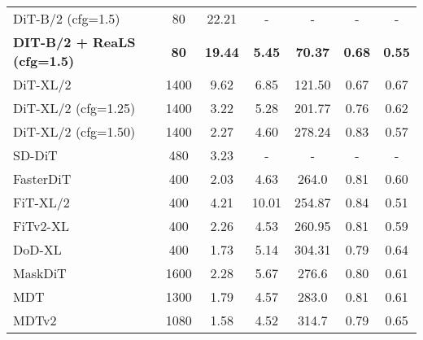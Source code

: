 \begin{table}[t]
{\begin{tabular}{lcccccc}
 \midrule

DiT-B/2 (cfg=1.5)~\cite{dit}          & 80     & 22.21           & -                & -            & -                   & -                \\
\rowcolor{blue!15} \textbf{DIT-B/2 + ReaLS (cfg=1.5)}   & \textbf{80}     & \textbf{19.44}           & \textbf{5.45}             & \textbf{70.37}        & \textbf{0.68}                & \textbf{0.55}             \\ 
DiT-XL/2                   & 1400   & 9.62            & 6.85             & 121.50       & 0.67                & 0.67             \\
DiT-XL/2 (cfg=1.25)      & 1400       & 3.22            & 5.28             & 201.77       & 0.76                & 0.62             \\
DiT-XL/2 (cfg=1.50)      & 1400       & 2.27            & 4.60             & 278.24       & 0.83                & 0.57             \\ 
SD-DiT~\cite{zhu2024sd}                     & 480    & 3.23            & -                & -            & -                   & -                \\ 
FasterDiT~\cite{yao2024fasterdit}                  & 400    & 2.03            & 4.63             & 264.0        & 0.81                & 0.60             \\ 
FiT-XL/2~\cite{Lu2024FiT} & 400  & 4.21 & 10.01 & 254.87 & 0.84 & 0.51\\
FiTv2-XL~\cite{wang2024fitv2} & 400 & 2.26 & 4.53 & 260.95 & 0.81 & 0.59 \\
DoD-XL~\cite{yue2024dod} & 400 & 1.73 & 5.14 & 304.31 & 0.79 & 0.64 \\
\midrule

MaskDiT~\cite{zheng2023fast}                    & 1600   & 2.28            & 5.67             & 276.6        & 0.80                & 0.61             \\ 
MDT~\cite{gao2023masked}                        & 1300   & 1.79            & 4.57             & 283.0        & 0.81                & 0.61             \\
MDTv2                      & 1080   & 1.58            & 4.52             & 314.7        & 0.79                & 0.65             \\ \midrule


\end{tabular}}
\end{table}
